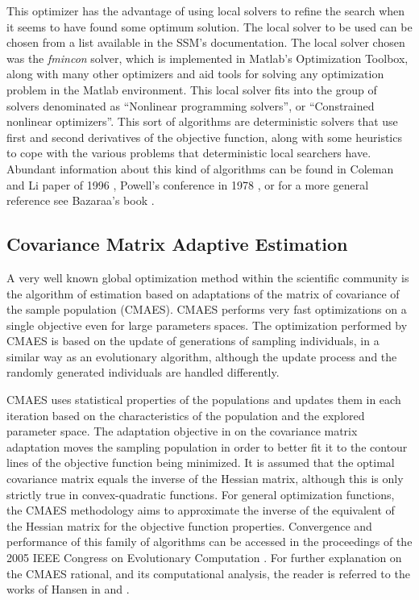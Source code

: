 This optimizer has the advantage of using local solvers to refine the search when it seems to have found some optimum solution. The local solver to be used can be chosen from a list available in the SSM's documentation. The local solver chosen was the \textit{fmincon} solver, which is implemented in Matlab's Optimization Toolbox, along with many other optimizers and aid tools for solving any optimization problem in the Matlab environment. This local solver fits into the group of solvers denominated as ``Nonlinear programming solvers'', or ``Constrained nonlinear optimizers''. This sort of algorithms are deterministic solvers that use first and second derivatives of the objective function, along with some heuristics to cope with the various problems that deterministic local searchers have. Abundant information about this kind of algorithms can be found in Coleman and Li paper of 1996 \cite{coleman1993interior}, Powell's conference in 1978 \cite{Powell1978NLSQP}, or for a more general reference see Bazaraa's book \cite{bazaraa2006nonlinear}.

\subsection{Covariance Matrix Adaptive Estimation}
\label{sec:CovarianceMatrixAdaptativeEstimation}

A very well known global optimization method within the scientific community is the algorithm of estimation based on adaptations of the matrix of covariance of the sample population (CMAES). CMAES performs very fast optimizations on a single objective even for large parameters spaces. The optimization performed by CMAES is based on the update of generations of sampling individuals, in a similar way as an evolutionary algorithm, although the update process and the randomly generated individuals are handled differently.

CMAES uses statistical properties of the populations and updates them in each iteration based on the characteristics of the population and the explored parameter space. The adaptation objective in on the covariance matrix adaptation moves the sampling population in order to better fit it to the contour lines of the objective function being minimized. It is assumed that the optimal covariance matrix equals the inverse of the Hessian matrix, although this is only strictly true in convex-quadratic functions. For general optimization functions, the CMAES methodology aims to approximate the inverse of the equivalent of the Hessian matrix for the objective function properties. Convergence and performance of this family of algorithms can be accessed in the proceedings of the 2005 IEEE Congress on Evolutionary Computation \cite{auger2005restart}. For further explanation on the CMAES rational, and its computational analysis, the reader is referred to the works of Hansen in \cite{hansen2006cma} and \cite{hansen2004evaluating}.

